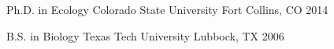 

\begin{cventries}

  \eduentry
    {Ph.D. in Ecology} %
    {Colorado State University} %
    {Fort Collins, CO} %
    {2014} %

  \eduentry
    {B.S. in Biology} %
    {Texas Tech University} %
    {Lubbock, TX} %
    {2006} %

\end{cventries}
